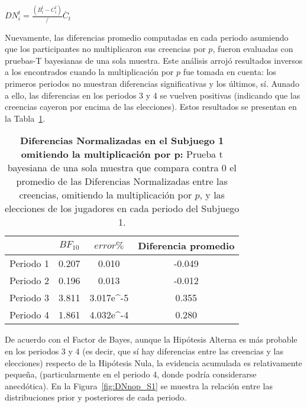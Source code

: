 \begin{center}
$DN_i^t=  \frac{(B_i^t- C_i^t)}/{\overline{C}_t}$ \\
\end{center}

Nuevamente, las diferencias promedio computadas en cada periodo asumiendo que los participantes no multiplicaron sus creencias por $p$, fueron evaluadas con pruebas-T bayesianas de una sola muestra.  Este análisis arrojó resultados inversos a los encontrados cuando la multiplicación por $p$ fue tomada en cuenta: los primeros periodos no muestran diferencias significativas y los últimos, sí.  Aunado a ello, las diferencias en los periodos 3 y 4 se vuelven positivas (indicando que las creencias cayeron por encima de las elecciones). Estos resultados se presentan en la Tabla~\ref{DNnop-S1-B}.\\


\begin{table}[h]
\caption[Diferencias Normalizadas en el Subjuego 1, omitiendo la multiplicación por $p$ (prueba t de una muestra)]{\textbf{Diferencias Normalizadas en el Subjuego 1 omitiendo la multiplicación por p:} Prueba t bayesiana de una sola muestra que compara contra 0 el promedio de las Diferencias Normalizadas entre las creencias, omitiendo la multiplicación por $p$, y las elecciones de los jugadores en cada periodo del Subjuego 1.}
\label{DNnop-S1-B}
\centering
\begin{tabular}{l | c c | c}
\toprule
\textbf{} & \textbf{$BF_{10}$} & \textbf{$error\%$} & \textbf{Diferencia promedio}\\
\midrule
Periodo 1 & 0.207 & 0.010 & -0.049\\
Periodo 2 & 0.196 & 0.013 & -0.012\\
Periodo 3 & 3.811 & 3.017e^-5 & 0.355\\
Periodo 4 & 1.861 & 4.032e^-4 & 0.280\\
\bottomrule
\end{tabular}
\end{table}

De acuerdo con el Factor de Bayes, aunque la Hipótesis Alterna es más probable en los periodos 3 y 4 (es decir, que sí hay diferencias entre las creencias y las elecciones) respecto de la Hipótesis Nula, la evidencia acumulada es relativamente pequeña, (particularmente en el periodo 4, donde podría considerarse anecdótica). En la Figura~\ref{fig:DNnop_S1} se muestra la relación entre las distribuciones prior y posteriores de cada periodo.\\

